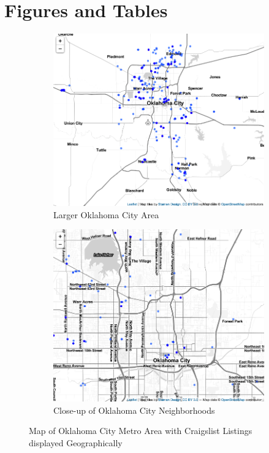\documentclass[12pt,english]{article}
\begin{document}
\vfill
\pagebreak{}
\clearpage

\section*{Figures and Tables}\label{sec:figTables}
\begin{figure} [ht]
\centering
\begin{subfigure}{.5\textwidth}
  \centering
  \includegraphics[width=.8\linewidth]{craigslist.mapfar.png}
  \caption{Larger Oklahoma City Area}
  \label{fig:sub1}
\end{subfigure}%
\begin{subfigure}{.5\textwidth}
  \centering
  \includegraphics[width=.8\linewidth]{craigslist.mapclose.png}
  \caption{Close-up of Oklahoma City Neighborhoods}
  \label{fig:sub2}
\end{subfigure}
\caption{Map of Oklahoma City Metro Area with Craigslist Listings displayed Geographically}
\label{fig:fig1}
\end{figure}
\end{document}
